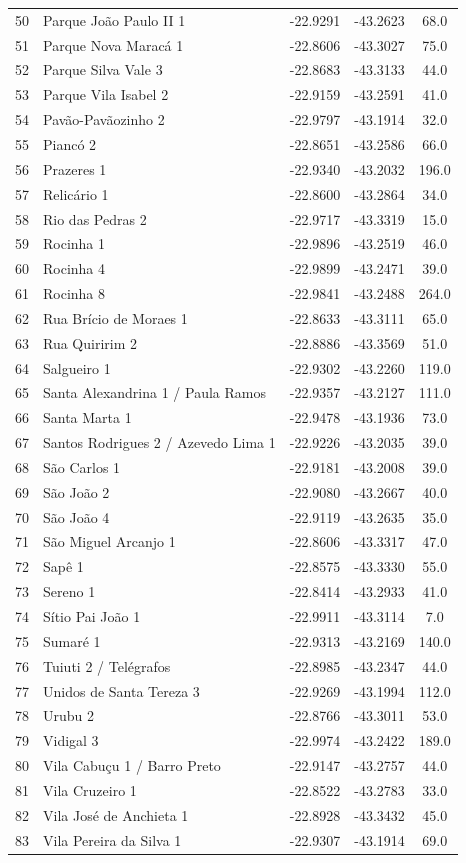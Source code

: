 \begin{longtable}{clccc}
50 & Parque João Paulo II 1 & -22.9291 & -43.2623 & 68.0 \\
51 & Parque Nova Maracá 1 & -22.8606 & -43.3027 & 75.0 \\
52 & Parque Silva Vale 3 & -22.8683 & -43.3133 & 44.0 \\
53 & Parque Vila Isabel 2 & -22.9159 & -43.2591 & 41.0 \\
54 & Pavão-Pavãozinho 2 & -22.9797 & -43.1914 & 32.0 \\
55 & Piancó 2 & -22.8651 & -43.2586 & 66.0 \\
56 & Prazeres 1 & -22.9340 & -43.2032 & 196.0 \\
57 & Relicário 1 & -22.8600 & -43.2864 & 34.0 \\
58 & Rio das Pedras 2 & -22.9717 & -43.3319 & 15.0 \\
59 & Rocinha 1 & -22.9896 & -43.2519 & 46.0 \\
60 & Rocinha 4 & -22.9899 & -43.2471 & 39.0 \\
61 & Rocinha 8 & -22.9841 & -43.2488 & 264.0 \\
62 & Rua Brício de Moraes 1 & -22.8633 & -43.3111 & 65.0 \\
63 & Rua Quiririm 2 & -22.8886 & -43.3569 & 51.0 \\
64 & Salgueiro 1 & -22.9302 & -43.2260 & 119.0 \\
65 & Santa Alexandrina 1 / Paula Ramos & -22.9357 & -43.2127 & 111.0 \\
66 & Santa Marta 1 & -22.9478 & -43.1936 & 73.0 \\
67 & Santos Rodrigues 2 / Azevedo Lima 1 & -22.9226 & -43.2035 & 39.0 \\
68 & São Carlos 1 & -22.9181 & -43.2008 & 39.0 \\
69 & São João 2 & -22.9080 & -43.2667 & 40.0 \\
70 & São João 4 & -22.9119 & -43.2635 & 35.0 \\
71 & São Miguel Arcanjo 1 & -22.8606 & -43.3317 & 47.0 \\
72 & Sapê 1 & -22.8575 & -43.3330 & 55.0 \\
73 & Sereno 1 & -22.8414 & -43.2933 & 41.0 \\
74 & Sítio Pai João 1 & -22.9911 & -43.3114 & 7.0 \\
75 & Sumaré 1 & -22.9313 & -43.2169 & 140.0 \\
76 & Tuiuti 2 / Telégrafos & -22.8985 & -43.2347 & 44.0 \\
77 & Unidos de Santa Tereza 3 & -22.9269 & -43.1994 & 112.0 \\
78 & Urubu 2 & -22.8766 & -43.3011 & 53.0 \\
79 & Vidigal 3 & -22.9974 & -43.2422 & 189.0 \\
80 & Vila Cabuçu 1 / Barro Preto & -22.9147 & -43.2757 & 44.0 \\
81 & Vila Cruzeiro 1 & -22.8522 & -43.2783 & 33.0 \\
82 & Vila José de Anchieta 1 & -22.8928 & -43.3432 & 45.0 \\
83 & Vila Pereira da Silva 1 & -22.9307 & -43.1914 & 69.0 \\
\end{longtable}
